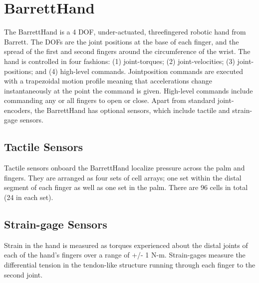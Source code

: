 \section{BarrettHand} 

The BarrettHand is a 4 DOF, under-actuated, threefingered robotic hand from Barrett.
The DOFs are the joint positions at the base of each finger, and the spread of the first and second fingers around the circumference of the wrist.
The hand is controlled in four fashions: (1) joint-torques; (2) joint-velocities; (3)
joint-positions; and (4) high-level commands.
Jointposition commands are executed with a trapezoidal motion profile meaning that accelerations change instantaneously at the point the command is given.
High-level commands include commanding any or all fingers to open or close.
Apart from standard joint-encoders, the BarrettHand has optional sensors, which include tactile and strain-gage sensors.

\subsection{Tactile Sensors} 

Tactile sensors onboard the BarrettHand localize pressure across the palm and fingers.
They are arranged as four sets of cell arrays; one set within the distal segment of each finger as well as one set in the palm.
There are 96 cells in total (24 in each set).

\subsection{Strain-gage Sensors} 

Strain in the hand is measured as torques experienced about the distal joints of each of the hand’s fingers over a range of +/- 1 N-m.
Strain-gages measure the differential tension in the tendon-like structure running through each finger to the second joint.
